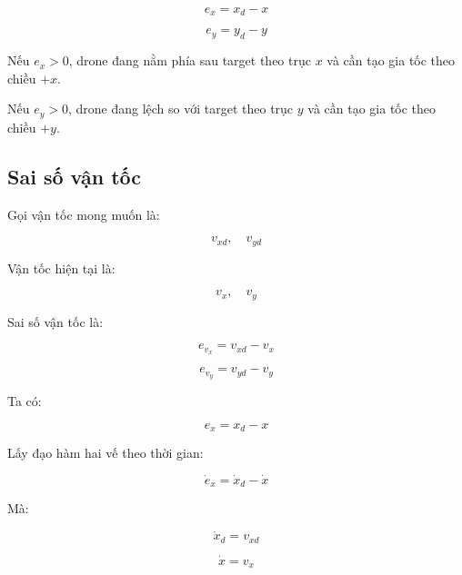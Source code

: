 \begin{equation}
    e_x = x_d - x
\end{equation}

\begin{equation}
    e_y = y_d - y
\end{equation}

Nếu $e_x > 0$, drone đang nằm phía sau target theo trục $x$ và cần tạo gia tốc
theo chiều $+x$.

Nếu $e_y > 0$, drone đang lệch so với target theo trục $y$ và cần tạo gia tốc
theo chiều $+y$.

\subsection{Sai số vận tốc}

Gọi vận tốc mong muốn là:

\begin{equation}
    v_{xd},\quad v_{yd}
\end{equation}

Vận tốc hiện tại là:

\begin{equation}
    v_x,\quad v_y
\end{equation}

Sai số vận tốc là:

\begin{equation}
    e_{v_x} = v_{xd} - v_x
\end{equation}

\begin{equation}
    e_{v_y} = v_{yd} - v_y
\end{equation}

Ta có:

\begin{equation}
    e_x = x_d - x
\end{equation}

Lấy đạo hàm hai vế theo thời gian:

\begin{equation}
    \dot{e}_x = \dot{x}_d - \dot{x}
\end{equation}

Mà:

\begin{equation}
    \dot{x}_d = v_{xd}
\end{equation}

\begin{equation}
    \dot{x} = v_x
\end{equation}

